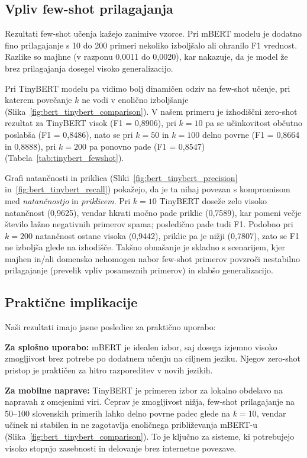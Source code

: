 \documentclass[sigconf,nonacm]{acmart}
\begin{document}
\subsection{Vpliv few-shot prilagajanja}

Rezultati few-shot učenja kažejo zanimive vzorce. Pri mBERT modelu je dodatno fino prilagajanje s 10 do 200 primeri nekoliko izboljšalo ali ohranilo F1 vrednost. Razlike so majhne (v razponu 0,0011 do 0,0020), kar nakazuje, da je model že brez prilagajanja dosegel visoko generalizacijo.

Pri TinyBERT modelu pa vidimo bolj dinamičen odziv na few-shot učenje, pri katerem povečanje $k$ ne vodi v enolično izboljšanje (Slika~\ref{fig:bert_tinybert_comparison}). V našem primeru je izhodiščni zero-shot rezultat za TinyBERT visok (F1 = 0,8906), pri $k=10$ pa se učinkovitost občutno poslabša (F1 = 0,8486), nato se pri $k=50$ in $k=100$ delno povrne (F1 = 0,8664 in 0,8888), pri $k=200$ pa ponovno pade (F1 = 0,8547) (Tabela~\ref{tab:tinybert_fewshot}).

Grafi natančnosti in priklica (Sliki~\ref{fig:bert_tinybert_precision} in~\ref{fig:bert_tinybert_recall}) pokažejo, da je ta nihaj povezan s kompromisom med \emph{natančnostjo} in \emph{priklicem}. Pri $k=10$ TinyBERT doseže zelo visoko natančnost (0,9625), vendar hkrati močno pade priklic (0,7589), kar pomeni večje število lažno negativnih primerov spama; posledično pade tudi F1. Podobno pri $k=200$ natančnost ostane visoka (0,9442), priklic pa je nižji (0,7807), zato se F1 ne izboljša glede na izhodišče. Takšno obnašanje je skladno s scenarijem, kjer majhen in/ali domensko nehomogen nabor few-shot primerov povzroči nestabilno prilagajanje (prevelik vpliv posameznih primerov) in slabšo generalizacijo.

\subsection{Praktične implikacije}

Naši rezultati imajo jasne posledice za praktično uporabo:

\textbf{Za splošno uporabo:} mBERT je idealen izbor, saj dosega izjemno visoko zmogljivost brez potrebe po dodatnem učenju na ciljnem jeziku. Njegov zero-shot pristop je praktičen za hitro razporeditev v novih jezikih.

\textbf{Za mobilne naprave:} TinyBERT je primeren izbor za lokalno obdelavo na napravah z omejenimi viri. Čeprav je zmogljivost nižja, few-shot prilagajanje na 50--100 slovenskih primerih lahko delno povrne padec glede na $k=10$, vendar učinek ni stabilen in ne zagotavlja enoličnega približevanja mBERT-u (Slika~\ref{fig:bert_tinybert_comparison}). To je ključno za sisteme, ki potrebujejo visoko stopnjo zasebnosti in delovanje brez internetne povezave.
\end{document}
